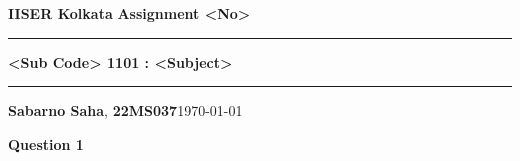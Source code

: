 \documentclass[addpoints]{exam}
\begin{document}
\par\textbf{IISER Kolkata} \hfill \textbf{Assignment <No>}
\vspace{3pt}
\hrule
\vspace{3pt}
\begin{center}
        \LARGE{\textbf{<Sub Code> 1101 : <Subject>}}
\end{center}
\vspace{3pt}

\hrule
\vspace{4pt}
\textbf{Sabarno Saha}, \textbf{22MS037}\hfill \today

\vspace{20pt}

\bigskip

\begin{questions}

\question \textbf{ Question 1}

\begin{solution}\\
 
\end{solution}


\end{questions}
\end{document}
